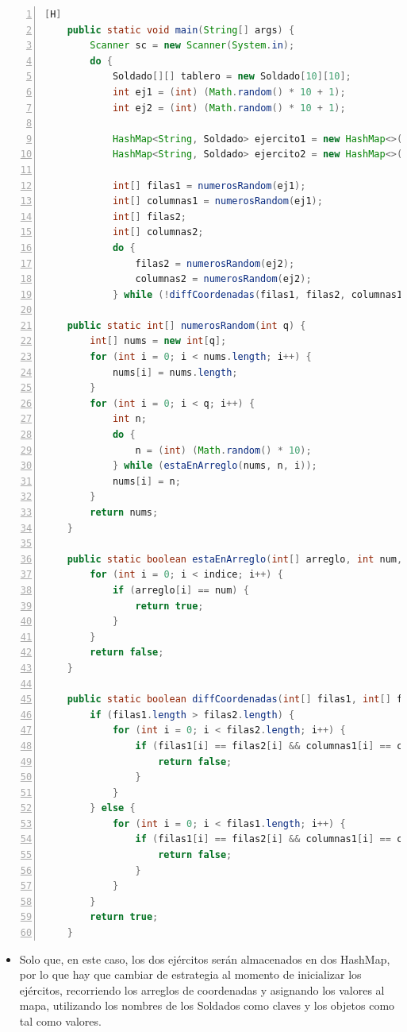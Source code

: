 \documentclass{article}
\begin{document}
	\begin{lstlisting}[language=java,caption={Código parcial reciclado}, numbers=left][H]
	public static void main(String[] args) {
        Scanner sc = new Scanner(System.in);
        do {
            Soldado[][] tablero = new Soldado[10][10];
            int ej1 = (int) (Math.random() * 10 + 1);
            int ej2 = (int) (Math.random() * 10 + 1);

            HashMap<String, Soldado> ejercito1 = new HashMap<>();
            HashMap<String, Soldado> ejercito2 = new HashMap<>();

            int[] filas1 = numerosRandom(ej1);
            int[] columnas1 = numerosRandom(ej1);
            int[] filas2;
            int[] columnas2;
            do {
                filas2 = numerosRandom(ej2);
                columnas2 = numerosRandom(ej2);
            } while (!diffCoordenadas(filas1, filas2, columnas1, columnas2));
    
    public static int[] numerosRandom(int q) {
        int[] nums = new int[q];
        for (int i = 0; i < nums.length; i++) {
            nums[i] = nums.length;
        }
        for (int i = 0; i < q; i++) {
            int n;
            do {
                n = (int) (Math.random() * 10);
            } while (estaEnArreglo(nums, n, i));
            nums[i] = n;
        }
        return nums;
    }

    public static boolean estaEnArreglo(int[] arreglo, int num, int indice) {
        for (int i = 0; i < indice; i++) {
            if (arreglo[i] == num) {
                return true;
            }
        }
        return false;
    }

    public static boolean diffCoordenadas(int[] filas1, int[] filas2, int[] columnas1, int[] columnas2) {
        if (filas1.length > filas2.length) {
            for (int i = 0; i < filas2.length; i++) {
                if (filas1[i] == filas2[i] && columnas1[i] == columnas2[i]) {
                    return false;
                }
            }
        } else {
            for (int i = 0; i < filas1.length; i++) {
                if (filas1[i] == filas2[i] && columnas1[i] == columnas2[i]) {
                    return false;
                }
            }
        }
        return true;
    }
	\end{lstlisting}
	\begin{itemize}	
		\item Solo que, en este caso, los dos ejércitos serán almacenados en dos HashMap, por lo que hay que cambiar de estrategia al momento de inicializar los ejércitos, recorriendo los arreglos de coordenadas y asignando los valores al mapa, utilizando los nombres de los Soldados como claves y los objetos como tal como valores.
	\end{itemize}
\end{document}
